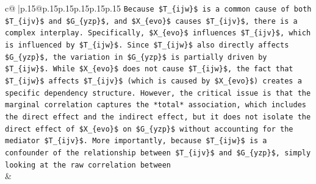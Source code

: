 \documentclass{article}
\begin{document}
{\begin{supertabular}{c@{$\;$}|p{.15\linewidth}@{}p{.15\linewidth}p{.15\linewidth}p{.15\linewidth}p{.15\linewidth}p{.15\linewidth}}
{{{\texttt{Because \$T\_\{ijw\}\$ is a common cause of both \$T\_\{ijv\}\$ and \$G\_\{yzp\}\$, and \$X\_\{evo\}\$ causes \$T\_\{ijv\}\$, there is a complex interplay. Specifically, \$X\_\{evo\}\$ influences \$T\_\{ijv\}\$, which is influenced by \$T\_\{ijw\}\$. Since \$T\_\{ijw\}\$ also directly affects \$G\_\{yzp\}\$, the variation in \$G\_\{yzp\}\$ is partially driven by \$T\_\{ijw\}\$. While \$X\_\{evo\}\$ does not cause \$T\_\{ijw\}\$, the fact that \$T\_\{ijw\}\$ affects \$T\_\{ijv\}\$ (which is caused by \$X\_\{evo\}\$) creates a specific dependency structure. However, the critical issue is that the marginal correlation captures the *total* association, which includes the direct effect and the indirect effect, but it does not isolate the direct effect of \$X\_\{evo\}\$ on \$G\_\{yzp\}\$ without accounting for the mediator \$T\_\{ijv\}\$. More importantly, because \$T\_\{ijw\}\$ is a confounder of the relationship between \$T\_\{ijv\}\$ and \$G\_\{yzp\}\$, simply looking at the raw correlation between} \\
            }
        }
    }
    & \\ \\


\end{supertabular}}
\end{document}
